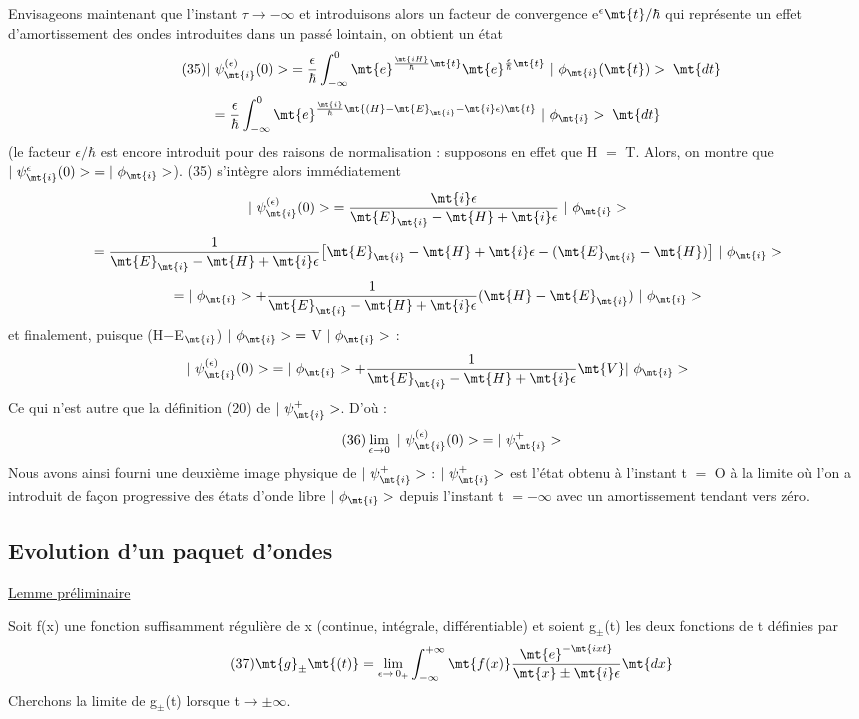 Envisageons maintenant que l'instant $\tau\to-\infty$ et introduisons alors un facteur de convergence
e$^\epsilon\mt{t}/\hbar$ qui représente un effet d'amortissement des ondes
introduites dans un passé lointain, on obtient un état
\[
\tag{35}|\ \psi_\mt{i}^{(\epsilon)}(0)>\;=\frac{\epsilon}{\hbar}\int_{-\infty}^0\mt{e}^{\frac{\mt{i H}}{\hbar}\mt{t}}
\mt{e}^{\frac{\epsilon}{\hbar}\mt{t}}\ |\ \phi_\mt{i}(\mt{t})>\;\mt{dt}
\]
\[
=\frac{\epsilon}{\hbar}\int_{-\infty}^0
\mt{e}^{\frac{\mt{i}}{\hbar}\mt{ (H}-\mt{E}_\mt{i}-\mt{i}\epsilon)\mt{ t}}\ |\ \phi_\mt{i}>\;\mt{dt}
\]
(le facteur $\epsilon/\hbar$ est encore introduit pour des raisons de normalisation :
supposons en effet que H $=$ T. Alors, on montre que $|\ \psi_\mt{i}^{\epsilon}(0)>\;=|\ \phi_\mt{i}>$).
(35) s'intègre alors immédiatement
\[
|\ \psi_\mt{i}^{(\epsilon)}(0)>\;=
\frac{\mt{i}\epsilon}{\mt{E}_\mt{i}-\mt{H}+\mt{i}\epsilon}
\ |\ \phi_\mt{i}>
\]
\[
=\frac{1}{\mt{E}_\mt{i}-\mt{H}+\mt{i}\epsilon}
\big[\mt{E}_\mt{i}-\mt{H}+\mt{i}\epsilon-(\mt{E}_\mt{i}-\mt{H})\big]
\ |\ \phi_\mt{i}>
\]
\[
=|\ \phi_\mt{i}>+
\frac{1}{\mt{E}_\mt{i}-\mt{H}+\mt{i}\epsilon}
(\mt{H}-\mt{E}_\mt{i})\ |\ \phi_\mt{i}>
\]
et finalement, puisque (H$-$E$_\mt{i}$) $|\ \phi_\mt{i}>\;=$ V $|\ \phi_\mt{i}>$ :
\[
|\ \psi_\mt{i}^{(\epsilon)}(0)>\;=
|\ \phi_\mt{i}>+
\frac{1}{\mt{E}_\mt{i}-\mt{H}+\mt{i}\epsilon}
\mt{ V }|\ \phi_\mt{i}>
\]
Ce qui n'est autre que la définition (20) de $|\ \psi_\mt{i}^+>$. D'où :
\[
\tag{36}\lim_{\epsilon\to0}\ |\ \psi_\mt{i}^{(\epsilon)}(0)>\;=|\ \psi_\mt{i}^+>
\]
Nous avons ainsi fourni une deuxième image physique de $|\ \psi_\mt{i}^+>$ :
$|\ \psi_\mt{i}^+>$ est l'état obtenu à l'instant t $=$ O à la limite où l'on a introduit
de façon progressive des états d'onde libre $|\ \phi_\mt{i}>$ depuis l'instant t $=-\infty$
avec un amortissement tendant vers zéro.


\subsection{Evolution d'un paquet d'ondes}%
\ul{Lemme préliminaire}

Soit f(x) une fonction suffisamment régulière de x (continue,
intégrale, différentiable) et soient g$_\pm$(t) les deux fonctions de t définies par
\[
\tag{37}\mt{g}_\pm\mt{(t)}=\lim_{\epsilon\to\,0_+}
\int_{-\infty}^{+\infty}\mt{f(x) }\frac{\mt{e}^{-\mt{ixt}}}{\mt{x}\pm\mt{i}\epsilon}\mt{ dx}
\]
Cherchons la limite de g$_\pm$(t) lorsque t$\to\pm\infty$.

